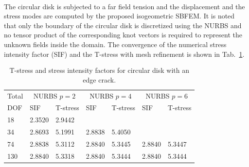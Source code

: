 \paragraph{}
The circular disk is subjected to a far field tension and the displacement and the stress modes are computed by the proposed isogeometric SBFEM.
It is noted that only the boundary of the circular disk is discretized using the NURBS and no tensor product of the corresponding knot vectors is required to represent the unknown fields inside the domain.
The convergence of the numerical stress intensity factor (SIF) and the T-stress with mesh refinement is shown in Tab.~\ref{iso_tab:circular_disk_res}.

\begin{table}[]
\caption{T-stress and stress intensity factors for circular disk with an edge crack.}
\label{iso_tab:circular_disk_res}
\begin{tabularx}{\textwidth}{XXXXXXX}
\toprule
    Total    &   \multicolumn{2}{c}{NURBS $p=2$} &\multicolumn{2}{c}{NURBS $p=4$} &\multicolumn{2}{c}{NURBS $p=6$}\\
    \cmidrule{2-7}
    DOF      &   SIF     &   T-stress            &SIF     &   T-stress            &SIF     &   T-stress           \\
    \cmidrule{1-1} \cmidrule{2-3} \cmidrule{4-5} \cmidrule{6-7}
    18       &   2.3520  &   2.9442              &        &                       &        &                      \\
    34       &   2.8693  &   5.1991              &2.8838  &5.4050                 &        &                      \\
    74       &   2.8838  &   5.3112              &2.8840  &5.3445                 &2.8840  &5.3447                \\
    130      &   2.8840  &   5.3318              &2.8840  &5.3444                 &2.8840  &5.3444                \\
\bottomrule
\end{tabularx}
\end{table}

